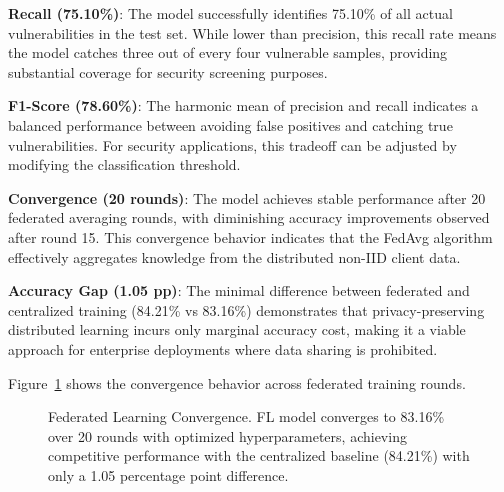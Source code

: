 \documentclass[pdflatex,sn-mathphys-num]{sn-jnl}
\theoremstyle{thmstyleone}%
\theoremstyle{thmstyletwo}%
\theoremstyle{thmstylethree}%
\begin{document}
\textbf{Recall (75.10\%)}: The model successfully identifies 75.10\% of all actual vulnerabilities in the test set. While lower than precision, this recall rate means the model catches three out of every four vulnerable samples, providing substantial coverage for security screening purposes.

\textbf{F1-Score (78.60\%)}: The harmonic mean of precision and recall indicates a balanced performance between avoiding false positives and catching true vulnerabilities. For security applications, this tradeoff can be adjusted by modifying the classification threshold.

\textbf{Convergence (20 rounds)}: The model achieves stable performance after 20 federated averaging rounds, with diminishing accuracy improvements observed after round 15. This convergence behavior indicates that the FedAvg algorithm effectively aggregates knowledge from the distributed non-IID client data.

\textbf{Accuracy Gap (1.05 pp)}: The minimal difference between federated and centralized training (84.21\% vs 83.16\%) demonstrates that privacy-preserving distributed learning incurs only marginal accuracy cost, making it a viable approach for enterprise deployments where data sharing is prohibited.

Figure~\ref{fig:fl_convergence} shows the convergence behavior across federated training rounds.

\begin{figure}[h]
\centering
{}
\caption{Federated Learning Convergence. FL model converges to 83.16\% over 20 rounds with optimized hyperparameters, achieving competitive performance with the centralized baseline (84.21\%) with only a 1.05 percentage point difference.}
\label{fig:fl_convergence}
\end{figure}
\end{document}
